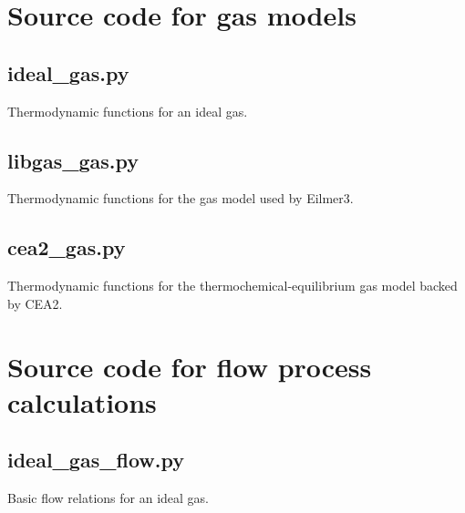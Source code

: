 \documentclass[landscape,12pt,a4paper]{article}
\begin{document}



\newpage




\newpage
\appendix
\section{Source code for gas models}
\label{gas-model-sec}
%
\subsection{ideal\_gas.py}
\label{ideal-gas-py}
%
Thermodynamic functions for an ideal gas.



\newpage
\subsection{libgas\_gas.py}
\label{libgas-gas-py}
%
Thermodynamic functions for the gas model used by Eilmer3.



\newpage
\subsection{cea2\_gas.py}
\label{cea2-gas-py}
%
Thermodynamic functions for the thermochemical-equilibrium gas model backed by CEA2.



\newpage
\section{Source code for flow process calculations}
\label{process-code-sec}
%
\subsection{ideal\_gas\_flow.py}
\label{ideal-gas-flow-py}
%
Basic flow relations for an ideal gas.
\end{document}
